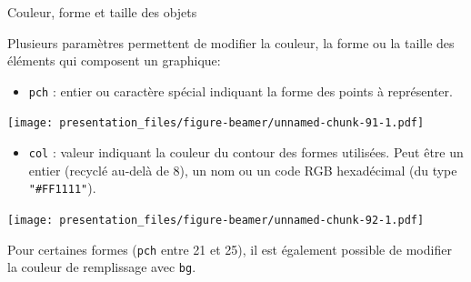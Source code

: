 \documentclass[12pt,ignorenonframetext,handout,]{beamer}
\providecommand{\tightlist}{%
  \setlength{\itemsep}{0pt}\setlength{\parskip}{0pt}}
\begin{document}
\begin{frame}[fragile]{Couleur, forme et taille des objets}
\protect\hypertarget{couleur-forme-et-taille-des-objets}{}

Plusieurs paramètres permettent de modifier la couleur, la forme ou la
taille des éléments qui composent un graphique:

\begin{itemize}
\tightlist
\item
  \pause \texttt{pch} : entier ou caractère spécial indiquant la forme
  des points à représenter.
\end{itemize}

\texttt{[image: presentation\_files/figure-beamer/unnamed-chunk-91-1.pdf]}

\begin{itemize}
\tightlist
\item
  \pause \texttt{col} : valeur indiquant la couleur du contour des
  formes utilisées. Peut être un entier (recyclé au-delà de 8), un nom
  ou un code RGB hexadécimal (du type \texttt{"\#FF1111"}). \small  
\end{itemize}

\texttt{[image: presentation\_files/figure-beamer/unnamed-chunk-92-1.pdf]}

Pour certaines formes (\texttt{pch} entre 21 et 25), il est également
possible de modifier la couleur de remplissage avec \texttt{bg}.

\end{frame}
\end{document}
